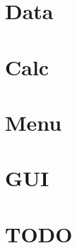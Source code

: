 \documentclass{book}
\begin{document}
\chapter{Data}

\chapter{Calc}

\chapter{Menu}

\chapter{GUI}

\chapter{TODO}
\end{document}
